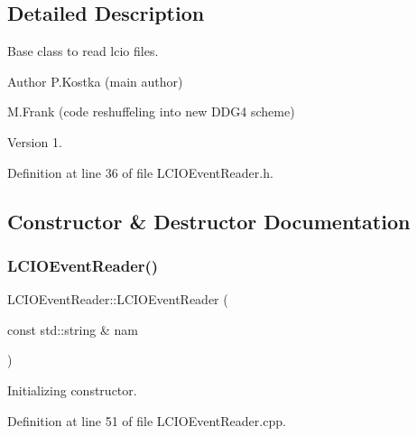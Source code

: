 \subsection{Detailed Description}
Base class to read lcio files. 

\begin{DoxyAuthor}{Author}
P.\+Kostka (main author) 

M.\+Frank (code reshuffeling into new D\+D\+G4 scheme) 
\end{DoxyAuthor}
\begin{DoxyVersion}{Version}
1. 
\end{DoxyVersion}


Definition at line 36 of file L\+C\+I\+O\+Event\+Reader.\+h.



\subsection{Constructor \& Destructor Documentation}
\hypertarget{class_d_d4hep_1_1_simulation_1_1_l_c_i_o_event_reader_a2fbe8df355a9afc3f26e3cbf85046144}{}\label{class_d_d4hep_1_1_simulation_1_1_l_c_i_o_event_reader_a2fbe8df355a9afc3f26e3cbf85046144} 
\subsubsection{\texorpdfstring{L\+C\+I\+O\+Event\+Reader()}{LCIOEventReader()}}
{\footnotesize\ttfamily L\+C\+I\+O\+Event\+Reader\+::\+L\+C\+I\+O\+Event\+Reader (\begin{DoxyParamCaption}\item[{const std\+::string \&}]{nam }\end{DoxyParamCaption})}



Initializing constructor. 



Definition at line 51 of file L\+C\+I\+O\+Event\+Reader.\+cpp.

\hypertarget{class_d_d4hep_1_1_simulation_1_1_l_c_i_o_event_reader_ad352960abd7fd0ff6c7e90775ba7be83}{}\label{class_d_d4hep_1_1_simulation_1_1_l_c_i_o_event_reader_ad352960abd7fd0ff6c7e90775ba7be83} 
